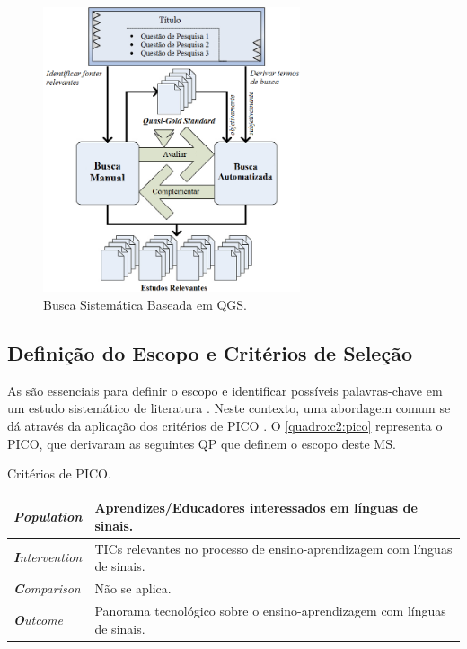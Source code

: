 \begin{figure}[htb]
\centering 
\caption{Busca Sistemática Baseada em QGS.}
\label{ms:zhang-approach}
\includegraphics[width=0.675\textwidth]{images/chapter2-sm-zhang-approach.png}
\end{figure}

\subsection{Definição do Escopo e Critérios de Seleção}
\label{ms:conducao-escopo}

As  são essenciais para definir o escopo e identificar possíveis palavras-chave em um estudo sistemático de literatura \cite{Kitchenham2007,Petersen2015}. Neste contexto, uma abordagem comum se dá através da aplicação dos critérios de PICO \cite{Petticrew2008}. O \autoref{quadro:c2:pico} representa o PICO, que derivaram as seguintes QP que definem o escopo deste MS.

\begin{quadro}[htb]
\centering
\caption{Critérios de PICO.}
\label{quadro:c2:pico}
\begin{tabularx}{\textwidth}{l|X} \hline
\textit{\textbf{P}opulation} & Aprendizes/Educadores interessados em línguas de sinais. \\ \hline
\textit{\textbf{I}ntervention} & TICs relevantes no processo de ensino-aprendizagem com línguas de sinais. \\ \hline
\textit{\textbf{C}omparison} & Não se aplica. \\ \hline
\textit{\textbf{O}utcome} & Panorama tecnológico sobre o ensino-aprendizagem com línguas de sinais. \\ \hline
\end{tabularx}
\end{quadro}

